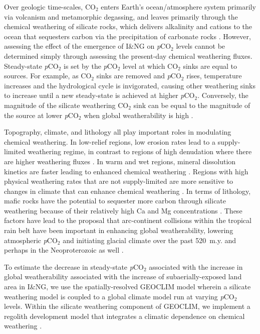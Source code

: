 \documentclass[11pt,letterpaper]{article}
\newcommand{\pCOtwo}{\textit{p}CO$_{2}$\xspace}
\newcommand{\COtwo}{CO$_{2}$\xspace}
\begin{document}
Over geologic time-scales, \COtwo enters Earth's ocean/atmosphere system primarily via volcanism and metamorphic degassing, and leaves primarily through the chemical weathering of silicate rocks, which delivers alkalinity and cations to the ocean that sequesters carbon via the precipitation of carbonate rocks \cite{Kump2000a}. However, assessing the effect of the emergence of I\&NG on \pCOtwo levels cannot be determined simply through assessing the present-day chemical weathering fluxes. Steady-state \pCOtwo is set by the \pCOtwo level at which \COtwo sinks are equal to sources. For example, as \COtwo sinks are removed and \pCOtwo rises, temperature increases and the hydrological cycle is invigorated, causing other weathering sinks to increase until a new steady-state is achieved at higher \pCOtwo. Conversely, the magnitude of the silicate weathering \COtwo sink can be equal to the magnitude of the source at lower \pCOtwo when global weatherability is high \cite{Kump1997a}.

Topography, climate, and lithology all play important roles in modulating chemical weathering. In low-relief regions, low erosion rates lead to a supply-limited weathering regime, in contrast to regions of high denudation where there are higher weathering fluxes \cite{Gabet2009a, West2012a, Maher2014a}. In warm and wet regions, mineral dissolution kinetics are faster leading to enhanced chemical weathering \cite{Lasaga1994a, West2012a}. Regions with high physical weathering rates that are not supply-limited are more sensitive to changes in climate that can enhance chemical weathering \cite{West2012a, Maher2014a}. In terms of lithology, mafic rocks have the potential to sequester more carbon through silicate weathering because of their relatively high Ca and Mg concentrations \cite{Dessert2003a}. These factors have lead to the proposal that arc-continent collisions within the tropical rain belt have been important in enhancing global weatherability, lowering atmospheric \pCOtwo and initiating glacial climate over the past 520~m.y. \cite{Jagoutz2016a, Swanson-Hysell2017a, Macdonald2019a} and perhaps in the Neoproterozoic as well \cite{Park2019a}.

To estimate the decrease in steady-state \pCOtwo associated with the increase in global weatherability associated with the increase of subaerially-exposed land area in I\&NG, we use the spatially-resolved GEOCLIM model \cite{Godderis2014a, Godderis2017c} wherein a silicate weathering model is coupled to a global climate model run at varying \pCOtwo levels. Within the silicate weathering component of GEOCLIM, we implement a regolith development model \cite{Gabet2009a} that integrates a climatic dependence on chemical weathering \cite{West2012a}.
\end{document}
